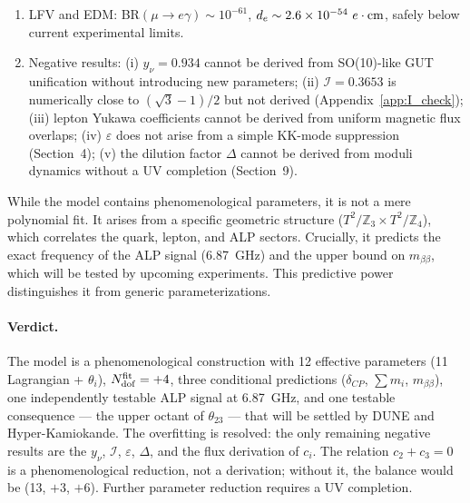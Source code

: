 \documentclass[12pt,a4paper]{article}
\numberwithin{equation}{section}
\begin{document}
\begin{enumerate}[leftmargin=1.5em]
\item LFV and EDM: BR\((\mu\to e\gamma) \sim 10^{-61}\), \(d_e \sim 2.6\times 10^{-54}~e\cdot{\rm cm}\), safely below current experimental limits.
\item Negative results: (i) \(y_\nu = 0.934\) cannot be derived from SO(10)-like GUT unification without introducing new parameters; (ii) \(\mathcal I = 0.3653\) is numerically close to \((\sqrt3-1)/2\) but not derived (Appendix~\ref{app:I_check}); (iii) lepton Yukawa coefficients cannot be derived from uniform magnetic flux overlaps; (iv) \(\varepsilon\) does not arise from a simple KK-mode suppression (Section~4); (v) the dilution factor \(\Delta\) cannot be derived from moduli dynamics without a UV completion (Section~9).
\end{enumerate}

While the model contains phenomenological parameters, it is not a mere polynomial fit. It arises from a specific geometric structure (\(T^2/\mathbb{Z}_3 \times T^2/\mathbb{Z}_4\)), which correlates the quark, lepton, and ALP sectors. Crucially, it predicts the exact frequency of the ALP signal (6.87~GHz) and the upper bound on \(m_{\beta\beta}\), which will be tested by upcoming experiments. This predictive power distinguishes it from generic parameterizations.

\paragraph{Verdict.} The model is a phenomenological construction with 12 effective parameters (11 Lagrangian + \(\theta_i\)), \(N_{\rm dof}^{\rm fit} = +4\), three conditional predictions (\(\delta_{CP}\), \(\sum m_i\), \(m_{\beta\beta}\)), one independently testable ALP signal at 6.87~GHz, and one testable consequence --- the upper octant of \(\theta_{23}\) --- that will be settled by DUNE and Hyper-Kamiokande. The overfitting is resolved: the only remaining negative results are the \(y_\nu\), \(\mathcal I\), \(\varepsilon\), \(\Delta\), and the flux derivation of \(c_i\). The relation \(c_2 + c_3 = 0\) is a phenomenological reduction, not a derivation; without it, the balance would be (13, \(+3\), \(+6\)). Further parameter reduction requires a UV completion.
\end{document}
